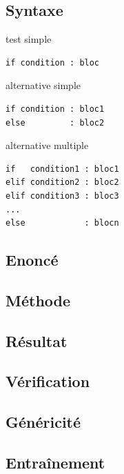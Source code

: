\subsection{Syntaxe \python}\label{tests:nombres:python}
\noindent\begin{minipage}[t]{0.3\textwidth}
test simple\footnotesize
\begin{Verbatim}
if condition : bloc
\end{Verbatim}
\end{minipage}
\hfill
\begin{minipage}[t]{0.3\textwidth}
alternative simple\footnotesize
\begin{Verbatim}
if condition : bloc1
else         : bloc2
\end{Verbatim}
\end{minipage}
\hfill
\begin{minipage}[t]{0.3\textwidth}
alternative multiple\footnotesize
\begin{Verbatim}
if   condition1 : bloc1
elif condition2 : bloc2
elif condition3 : bloc3
...
else            : blocn
\end{Verbatim}
\end{minipage}

\subsection{Enoncé}\label{tests:nombres:enonce}

\subsection{Méthode}\label{tests:nombres:methode}

\subsection{Résultat}\label{tests:nombres:resultat}

\subsection{Vérification}\label{tests:nombres:verification}

\subsection{Généricité}\label{tests:nombres:genericite}

\subsection{Entraînement}\label{tests:nombres:entrainement}


